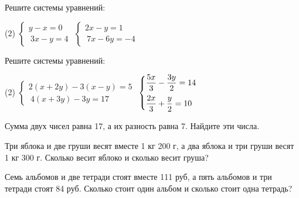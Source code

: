 \begin{homework}[number=3]
	\begin{listofex}
		\item Решите системы уравнений:
		\begin{tasks}(2)
			\task \( \begin{cases}
				y-x=0 \\\
				3x-y=4
			\end{cases} \)
			\task \( \begin{cases}
				2x-y=1 \\\
				7x-6y=-4
			\end{cases} \)
		\end{tasks}
		\item Решите системы уравнений:
		\begin{tasks}(2)
			\task \( \begin{cases}
				2(x+2y)-3(x-y)=5 \\\
				4(x+3y)-3y=17
			\end{cases} \)
			\task \( \begin{cases}
				\dfrac{5x}{3}-\dfrac{3y}{2}=14 \vspace{0,2cm}\\
				\dfrac{2x}{3}+\dfrac{y}{2}=10
			\end{cases} \)
		\end{tasks}
		\item Сумма двух чисел равна 17, а их разность равна 7. Найдите эти числа.
		\item Три яблока и две груши весят вместе 1 кг 200 г, а два яблока и три груши весят 1 кг 300 г. Сколько весит яблоко и сколько весит груша?
		\item Семь альбомов и две тетради стоят вместе 111 руб, а пять альбомов и три тетради стоят 84 руб. Сколько стоит один альбом и сколько стоит одна тетрадь?
	\end{listofex}
\end{homework}

